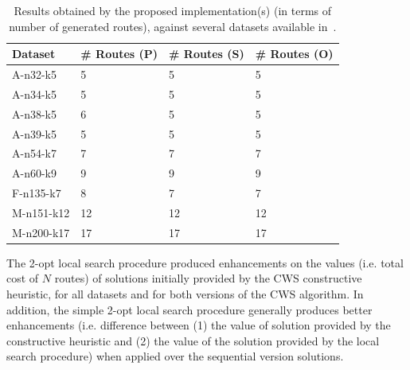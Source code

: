\begin{table}[h!]
    \centering
    \begin{threeparttable}
    \footnotesize
        \begin{tabularx}{0.45\textwidth}{ X X X X }
            \toprule
            \textbf{Dataset} & \textbf{\# Routes (P)} & \textbf{\# Routes (S)} & \textbf{\# Routes (O)} \\ [0.5ex]
            \midrule
            A-n32-k5 & 5 & 5 & 5 \\ [0.5ex]
            \midrule
            A-n34-k5 & 5 & 5 & 5 \\ [0.5ex]
            \midrule
            A-n38-k5 & 6 & 5 & 5 \\ [0.5ex]
            \midrule
            A-n39-k5 & 5 & 5 & 5 \\ [0.5ex]
            \midrule
            A-n54-k7 & 7 & 7 & 7 \\ [0.5ex]
            \midrule
            A-n60-k9 & 9 & 9 & 9 \\ [0.5ex]
            \midrule
            F-n135-k7 & 8 & 7 & 7 \\ [0.5ex]
            \midrule
            M-n151-k12 & 12 & 12 & 12 \\ [0.5ex]
            \midrule
            M-n200-k17 & 17 & 17 & 17 \\ [0.5ex]
            \bottomrule
        \end{tabularx}
    \caption{Results obtained by the proposed implementation(s) (in terms of 
            number of generated routes), against several datasets available 
            in~\cite{website:cvrp-datasets}.}
    \label{tab:results-3}
    \end{threeparttable}
\end{table}

The 2-opt local search procedure produced enhancements on the values (i.e. 
total cost of $N$ routes) of solutions 
initially provided by the CWS constructive heuristic, for all datasets and for 
both versions of the CWS algorithm. In addition, the simple 2-opt local search 
procedure generally produces better enhancements (i.e. difference between (1) the value 
of solution provided by the constructive heuristic and (2) the value of the 
solution provided by the local search procedure) when applied over the 
sequential version solutions.\vertbreak

